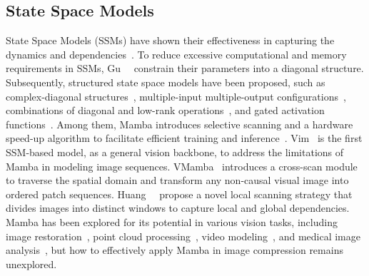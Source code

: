 \subsection{State Space Models}


State Space Models (SSMs) have shown their effectiveness in capturing the dynamics and dependencies~\cite{gu2020hippo, gu2021combining, goel2022s}.
To reduce excessive computational and memory requirements in SSMs, Gu~\etal~\cite{gu2021efficiently} constrain their parameters into a diagonal structure.
Subsequently, structured state space models have been proposed, such as complex-diagonal structures~\cite{gu2022parameterization, gupta2022diagonal}, multiple-input multiple-output configurations~\cite{smith2022simplified}, combinations of diagonal and low-rank operations~\cite{hasani2022liquid}, and gated activation functions~\cite{mehta2023long}.
Among them, Mamba introduces selective scanning and a hardware speed-up algorithm to facilitate efficient training and inference~\cite{gu2023mamba}.
Vim~\cite{zhu2024vision} is the first SSM-based model, as a general vision backbone, to address the limitations of Mamba in modeling image sequences.
VMamba~\cite{liu2024vmamba} introduces a cross-scan module to traverse the spatial domain and transform any non-causal visual image into ordered patch sequences.
Huang~\etal~\cite{huang2024localmamba} propose a novel local scanning strategy that divides images into distinct windows to capture local and global dependencies.
Mamba has been explored for its potential in various vision tasks, including image restoration~\cite{guo2024mambair, cheng2024activating, deng2024cu, shi2024vmambair}, point cloud processing~\cite{li20243dmambacomplete, liang2024pointmamba, liu2024point, zhang2024point}, video modeling~\cite{chen2024video, li2024videomamba, zou2024rhythmmamba}, and medical image analysis~\cite{ma2024u, yue2024medmamba, ma2024semi}, but how to effectively apply Mamba in image compression remains unexplored. 